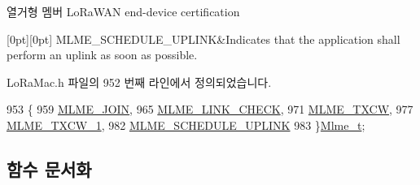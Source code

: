 \begin{DoxyEnumFields}{열거형 멤버}
Lo\+Ra\+W\+AN end-\/device certification \\
\hline

[0pt][0pt]{}\mbox{\label{group___l_o_r_a_m_a_c_gga320f4c08fe99747b08463689be624f7bada36c2ddbd1f26a8ff146b348dd30e96}} 
M\+L\+M\+E\+\_\+\+S\+C\+H\+E\+D\+U\+L\+E\+\_\+\+U\+P\+L\+I\+NK&Indicates that the application shall perform an uplink as soon as possible. \\
\hline

\end{DoxyEnumFields}


Lo\+Ra\+Mac.\+h 파일의 952 번째 라인에서 정의되었습니다.


\begin{DoxyCode}
953 \{
959     \mbox{\hyperlink{group___l_o_r_a_m_a_c_gga320f4c08fe99747b08463689be624f7ba475ad5dea1c4c13b93b31095c665e92e}{MLME\_JOIN}},
965     \mbox{\hyperlink{group___l_o_r_a_m_a_c_gga320f4c08fe99747b08463689be624f7ba57ba2a5951a2a4637ff0e574c0e48750}{MLME\_LINK\_CHECK}},
971     \mbox{\hyperlink{group___l_o_r_a_m_a_c_gga320f4c08fe99747b08463689be624f7ba7633734852fb50e0f241ae8059b0aed1}{MLME\_TXCW}},
977     \mbox{\hyperlink{group___l_o_r_a_m_a_c_gga320f4c08fe99747b08463689be624f7ba9a6b50c77269c8fbff9a5a6d33574503}{MLME\_TXCW\_1}},
982     \mbox{\hyperlink{group___l_o_r_a_m_a_c_gga320f4c08fe99747b08463689be624f7bada36c2ddbd1f26a8ff146b348dd30e96}{MLME\_SCHEDULE\_UPLINK}}
983 \}\mbox{\hyperlink{group___l_o_r_a_m_a_c_ga663544b83d50ec3518608be495896809}{Mlme\_t}};
\end{DoxyCode}


\subsection{함수 문서화}
\mbox{\label{group___l_o_r_a_m_a_c_gad74920538f07f34e773ca5de9ec89370}} 

